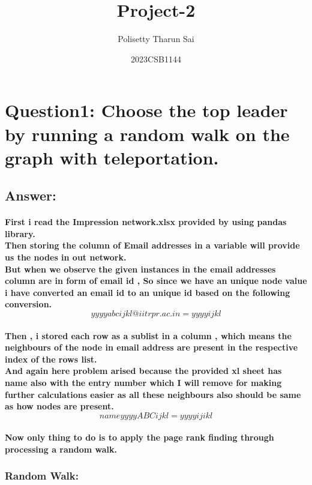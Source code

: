 \documentclass{article}
\title{Project-2}
\author{Polisetty Tharun Sai}
\date{2023CSB1144}
\begin{document}
\maketitle

\section*{Question1: Choose the top leader by running a random walk on the graph with teleportation.}
\subsection*{Answer:}
\paragraph{First i read the Impression network.xlsx provided by using pandas library.\\ Then storing the column of Email addresses in a variable will provide us the nodes in out network.\\ But when we observe the given instances in the email addresses column are in form of email id , So since we have an unique node value i have converted an email id to an unique id based on the following conversion. 
   $$ yyyyabcijkl@iitrpr.ac.in =  yyyyijkl $$}
\paragraph{Then , i stored each row as a sublist in a column ,  which means the neighbours of the node in email address are present in the respective index of the rows list.\\And again here problem arised because the provided xl sheet has name also with the entry number which I will remove for making further calculations easier as all these neighbours also should be same as how nodes are present. $$name yyyyABCijkl = yyyyijikl$$ }
\paragraph{Now only thing to do is to apply the page rank finding through processing a random walk.}
\subsubsection*{Random Walk:}
\end{document}
